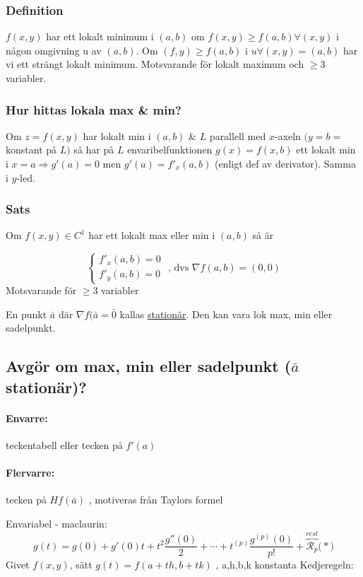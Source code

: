\documentclass[a4paper]{article}
\begin{document}
\subsubsection{Definition}
\(f(x,y)\) har ett lokalt minimum i \((a,b)\) om \(f(x,y) \geq f(a,b) \forall (x,y)\) i någon omgivning u av \((a,b)\). Om \((f,y) \geq f(a,b)\) i \(u \forall (x,y) = (a,b)\) har vi ett strängt lokalt minimum.
Motsvarande för lokalt maximum och \(\geq 3\) variabler.

\subsubsection{Hur hittas lokala max \& min?}
Om \(z=f(x,y)\) har lokalt min i \((a,b)\) \& \(L\) parallell med \(x\)-axeln \(\big(y=b=\)konstant på \(L \big)\) så har på \(L\) envaribelfunktionen \(g(x) = f(x,b)\) ett lokalt min i \(x=a \Rightarrow g'(a) = 0\) men 
\(g'(a) = f'_x(a,b)\) \big(enligt def av derivator\big). Samma i \(y\)-led.

\subsubsection{Sats}
Om \(f(x,y) \in C^1\) har ett lokalt max eller min i \((a,b)\) så är

$$
\left\{\begin{array}{rcl}
	f'_x(a,b) = 0 \\
	f'_y(a,b) = 0
\end{array}\right.
\text{ , dvs }\nabla f(a,b) = (0,0)
$$
Motsvarande för $\geq 3$ variabler

En punkt $\bar{a}$ där $\nabla f(\bar{a} = \bar{0}$ kallas \underline{stationär}. Den kan vara lok max, min eller sadelpunkt.

\newpage
\subsection{Avgör om max, min eller sadelpunkt (\texorpdfstring{$\bar{a}$}{a} stationär)?} \label{sec:Hessian}
\paragraph{Envarre:} teckentabell eller tecken på $f'(a)$
\paragraph{Flervarre:} tecken på $H f(\bar{a})$ , motiveras från Taylors formel

Envariabel - maclaurin: 
\begin{equation}\label{eq:6.1}
	g(t) = g(0) + g'(0)t + t^2\frac{g''(0)}{2} + \cdots + t^{(p)}\frac{g^{(p)}(0)}{p!} + \overbrace{\mathcal{R}_p}^{rest} \Big(*\Big)
\end{equation}
Givet $f(x,y)$, sätt $g(t) = f(a+th,b+tk)$ ,  a,h,b,k konstanta \newline
Kedjeregeln:
\end{document}
